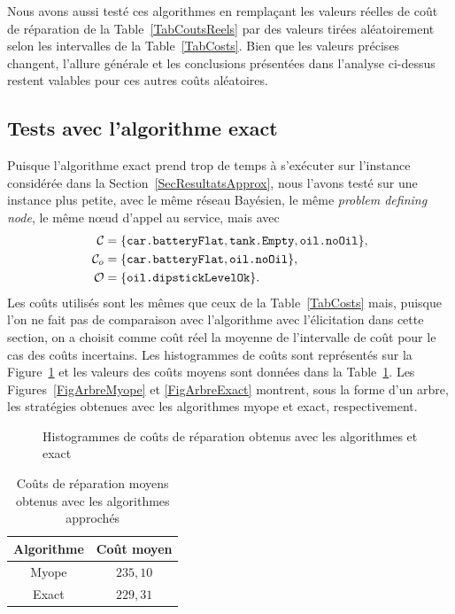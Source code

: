 \documentclass[a4paper,11pt]{article}
\theoremstyle{plain}
\theoremstyle{definition}
\begin{document}
Nous avons aussi testé ces algorithmes en remplaçant les valeurs réelles de coût de réparation de la Table~\ref{TabCoutsReels} par des valeurs tirées aléatoirement selon les intervalles de la Table~\ref{TabCosts}. Bien que les valeurs précises changent, l'allure générale et les conclusions présentées dans l'analyse ci-dessus restent valables pour ces autres coûts aléatoires.

\subsection{Tests avec l'algorithme exact}

Puisque l'algorithme exact prend trop de temps à s'exécuter sur l'instance considérée dans la Section~\ref{SecResultatsApprox}, nous l'avons testé sur une instance plus petite, avec le même réseau Bayésien, le même \emph{problem defining node}, le même nœud d'appel au service, mais avec
\begin{align*}
\mathcal C & = \{\text{\texttt{car.batteryFlat}}, \text{\texttt{tank.Empty}}, \text{\texttt{oil.noOil}}\}, \\
\mathcal C_o & = \{\text{\texttt{car.batteryFlat}}, \text{\texttt{oil.noOil}}\}, \\
\mathcal O & = \{\text{\texttt{oil.dipstickLevelOk}}\}.
\end{align*}
Les coûts utilisés sont les mêmes que ceux de la Table~\ref{TabCosts} mais, puisque l'on ne fait pas de comparaison avec l'algorithme avec l'élicitation dans cette section, on a choisit comme coût réel la moyenne de l'intervalle de coût pour le cas des coûts incertains. Les histogrammes de coûts sont représentés sur la Figure~\ref{FigHistoExact} et les valeurs des coûts moyens sont données dans la Table~\ref{TabECsExact}. Les Figures~\ref{FigArbreMyope} et \ref{FigArbreExact} montrent, sous la forme d'un arbre, les stratégies obtenues avec les algorithmes myope et exact, respectivement.

\begin{figure}[ht]
\centering
\resizebox{\textwidth}{!}{}
\caption{Histogrammes de coûts de réparation obtenus avec les algorithmes et exact}
\label{FigHistoExact}
\end{figure}

\begin{table}[ht]
\centering
\caption{Coûts de réparation moyens obtenus avec les algorithmes approchés}
\label{TabECsExact}
\begin{tabular}{cc}
\toprule
Algorithme & Coût moyen \tabularnewline
\midrule
Myope & $235,10$ \tabularnewline
Exact & $229,31$ \tabularnewline
\bottomrule
\end{tabular}
\end{table}
\end{document}
